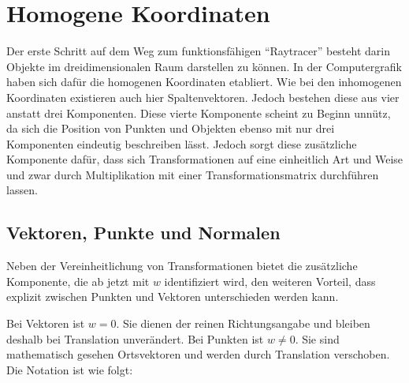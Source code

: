 
\chapter{Homogene Koordinaten}\label{cha:hom_koord}

Der erste Schritt auf dem Weg zum funktionsfähigen "`Raytracer"' besteht darin Objekte im dreidimensionalen Raum darstellen zu können. In der Computergrafik haben sich dafür die homogenen Koordinaten etabliert. Wie bei den inhomogenen Koordinaten existieren auch hier Spaltenvektoren. Jedoch bestehen diese aus vier anstatt drei Komponenten. Diese vierte Komponente scheint zu Beginn unnütz, da sich die Position von Punkten und Objekten ebenso mit nur drei Komponenten eindeutig beschreiben lässt. Jedoch sorgt diese zusätzliche Komponente dafür, dass sich Transformationen auf eine einheitlich Art und Weise und zwar durch Multiplikation mit einer Transformationsmatrix durchführen lassen.


\section{Vektoren, Punkte und Normalen}

Neben der Vereinheitlichung von Transformationen bietet die zusätzliche Komponente, die ab jetzt mit \( w \) identifiziert wird, den weiteren Vorteil, dass explizit zwischen Punkten und Vektoren unterschieden werden kann.

Bei Vektoren ist \( w = 0 \). Sie dienen der reinen Richtungsangabe und bleiben deshalb bei Translation unverändert. Bei Punkten ist \( w \ne 0 \). Sie sind mathematisch gesehen Ortsvektoren und werden durch Translation verschoben. Die Notation ist wie folgt:



